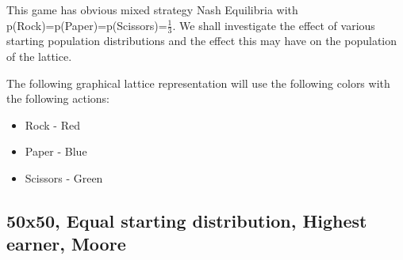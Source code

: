 \documentclass[a4paper, 11pt]{article}
\begin{document}
This game has obvious mixed strategy Nash Equilibria with p(Rock)=p(Paper)=p(Scissors)=$\frac{1}{3}$. We shall investigate the effect of various starting population distributions and the effect this may have on the population of the lattice.

The following graphical lattice representation will use the following colors with the following actions:
\begin{itemize}[noitemsep]
  \item Rock - Red
  \item Paper - Blue
  \item Scissors - Green
\end{itemize}



\newpage
\begin{landscape}
\subsection{50x50, Equal starting distribution, Highest earner, Moore}


\end{landscape}
\end{document}
